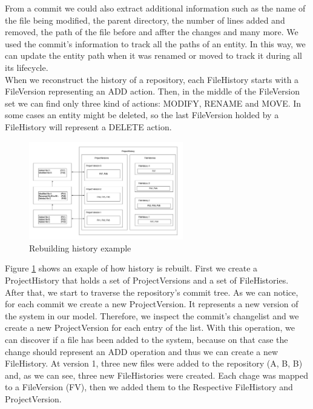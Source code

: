 From a commit we could also extract additional information such as the name of the file being modified, the parent directory, the number of lines added and removed, the path of the file before and affter the changes and many more.
We used the commit's information to track all the paths of an entity. In this way, we can update the entity path when it was renamed or moved to track it during all its lifecycle. \\
\linebreak
When we reconstruct the history of a repository, each FileHistory starts with a FileVersion representing an ADD action. Then, in the middle of the FileVersion set we can find only three kind of actions: MODIFY, RENAME and MOVE. 
In some cases an entity might be deleted, so the last FileVersion holded by a FileHistory will represent a DELETE action. 

\begin{figure}
    \includegraphics[width=0.6\textwidth]{ApproachExample.png}
    \caption{Rebuilding history example}
    \label{fig:ApproachExample}
\end{figure}

Figure \ref{fig:ApproachExample} shows an exaple of how history is rebuilt. 
First we create a ProjectHistory that holds a set of ProjectVersions and a set of FileHistories. 
After that, we start to traverse the repository's commit tree.
As we can notice, for each commit we create a new ProjectVersion. It represents a new version of the system in our model. 
Therefore, we inspect the commit's changelist and we create a new ProjectVersion for each entry of the list.
With this operation, we can discover if a file has been added to the system, because on that case the change should represent an ADD operation and thus we can create a new FileHistory. 
At version 1, three new files were added to the repository (A, B, B) and, as we can see, three new FileHistories were created. 
Each chage was mapped to a FileVersion (FV), then we added them to the Respective FileHistory and ProjectVersion. 

